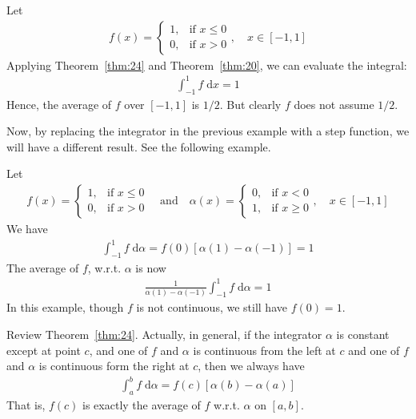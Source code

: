 \documentclass[thmcnt=section, 12pt]{my-elegantbook}
\begin{document}
\begin{example} \label{eg:9}
	Let 
	\begin{align*}
		f(x) = \begin{cases}
			1,
			&\text{if $x \leq 0$} \\
			0,
			&\text{if $x > 0$}
		\end{cases},
		\quad
		x \in [-1, 1]
	\end{align*}
	Applying Theorem~\ref{thm:24} and Theorem~\ref{thm:20},
	we can evaluate the integral: 
	\begin{align*}
		\int_{-1}^1 f \; \mathrm{d} x = 1
	\end{align*}
	Hence, the average of $f$ over $[-1, 1]$ is $1 / 2$.
	But clearly $f$ does not assume $1/2$.
\end{example}

Now, by replacing the integrator in the previous example
with a step function, we will have a different result.
See the following example.

\begin{example} \label{eg:10}
	Let 
	\begin{align*}
		f(x) = \begin{cases}
			1,
			&\text{if $x \leq 0$} \\
			0,
			&\text{if $x > 0$}
		\end{cases}
		\quad \text{and} \quad
		\alpha(x) = \begin{cases}
			0,
			&\text{if $x < 0$} \\
			1,
			&\text{if $x \geq 0$}
		\end{cases},
		\quad
		x \in [-1, 1]
	\end{align*}
	We have 
	\begin{align*}
		\int_{-1}^1 f \; \mathrm{d} \alpha
		= f(0) [\alpha(1) - \alpha(-1)]
		= 1
	\end{align*}
	The average of $f$, w.r.t. $\alpha$ is now
	\begin{align*}
		\frac{1}{ \alpha(1) - \alpha(-1) } 
		\int_{-1}^1 f \; \mathrm{d} \alpha
		= 1
	\end{align*}
	In this example, though $f$ is not continuous, 
	we still have $f(0) = 1$.
\end{example}

Review Theorem~\ref{thm:24}. 
Actually, in general, if the integrator $\alpha$
is constant except at point $c$,
and one of $f$ and $\alpha$ is continuous from the left at $c$
and one of $f$ and $\alpha$ is continuous form the right at $c$, 
then we always have 
\begin{align*}
	\int_a^b f \; \mathrm{d} \alpha
	= f(c) [\alpha(b) - \alpha(a)]
\end{align*}
That is, $f(c)$ is exactly the average of $f$ w.r.t. $\alpha$ on $[a, b]$.
\end{document}
